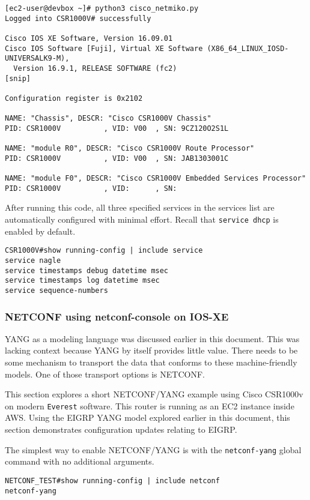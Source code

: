 \begin{verbatim}
[ec2-user@devbox ~]# python3 cisco_netmiko.py
Logged into CSR1000V# successfully

Cisco IOS XE Software, Version 16.09.01
Cisco IOS Software [Fuji], Virtual XE Software (X86_64_LINUX_IOSD-UNIVERSALK9-M),
  Version 16.9.1, RELEASE SOFTWARE (fc2)
[snip]

Configuration register is 0x2102

NAME: "Chassis", DESCR: "Cisco CSR1000V Chassis"
PID: CSR1000V          , VID: V00  , SN: 9CZ120O2S1L

NAME: "module R0", DESCR: "Cisco CSR1000V Route Processor"
PID: CSR1000V          , VID: V00  , SN: JAB1303001C

NAME: "module F0", DESCR: "Cisco CSR1000V Embedded Services Processor"
PID: CSR1000V          , VID:      , SN:
\end{verbatim}

After running this code, all three specified services in the services list are
automatically configured with minimal effort. Recall that \verb|service dhcp|
is enabled by default.

\begin{verbatim}
CSR1000V#show running-config | include service
service nagle
service timestamps debug datetime msec
service timestamps log datetime msec
service sequence-numbers
\end{verbatim}

\subsubsection{NETCONF using netconf-console on IOS-XE}
YANG as a modeling language was discussed earlier in this document. This was
lacking context because YANG by itself provides little value. There needs to
be some mechanism to transport the data that conforms to these
machine-friendly models. One of those transport options is NETCONF\@.

This section explores a short NETCONF/YANG example using Cisco CSR1000v on
modern \verb|Everest| software. This router is running as an EC2 instance inside
AWS\@. Using the EIGRP YANG model explored earlier in this document, this
section demonstrates configuration updates relating to EIGRP\@.

The simplest way to enable NETCONF/YANG is with the \verb|netconf-yang| global
command with no additional arguments.

\begin{verbatim}
NETCONF_TEST#show running-config | include netconf
netconf-yang
\end{verbatim}

